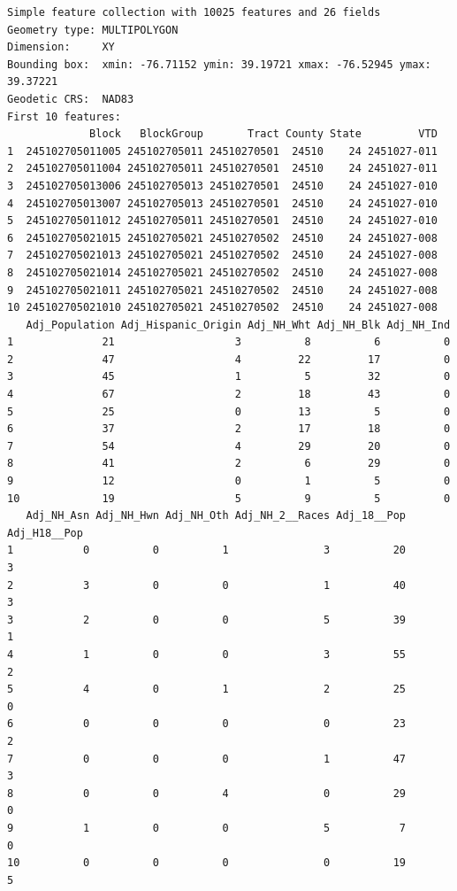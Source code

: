 \documentclass[
  letterpaper,
  DIV=11,
  numbers=noendperiod]{scrreprt}
\begin{document}
\begin{verbatim}
Simple feature collection with 10025 features and 26 fields
Geometry type: MULTIPOLYGON
Dimension:     XY
Bounding box:  xmin: -76.71152 ymin: 39.19721 xmax: -76.52945 ymax: 39.37221
Geodetic CRS:  NAD83
First 10 features:
             Block   BlockGroup       Tract County State         VTD
1  245102705011005 245102705011 24510270501  24510    24 2451027-011
2  245102705011004 245102705011 24510270501  24510    24 2451027-011
3  245102705013006 245102705013 24510270501  24510    24 2451027-010
4  245102705013007 245102705013 24510270501  24510    24 2451027-010
5  245102705011012 245102705011 24510270501  24510    24 2451027-010
6  245102705021015 245102705021 24510270502  24510    24 2451027-008
7  245102705021013 245102705021 24510270502  24510    24 2451027-008
8  245102705021014 245102705021 24510270502  24510    24 2451027-008
9  245102705021011 245102705021 24510270502  24510    24 2451027-008
10 245102705021010 245102705021 24510270502  24510    24 2451027-008
   Adj_Population Adj_Hispanic_Origin Adj_NH_Wht Adj_NH_Blk Adj_NH_Ind
1              21                   3          8          6          0
2              47                   4         22         17          0
3              45                   1          5         32          0
4              67                   2         18         43          0
5              25                   0         13          5          0
6              37                   2         17         18          0
7              54                   4         29         20          0
8              41                   2          6         29          0
9              12                   0          1          5          0
10             19                   5          9          5          0
   Adj_NH_Asn Adj_NH_Hwn Adj_NH_Oth Adj_NH_2__Races Adj_18__Pop Adj_H18__Pop
1           0          0          1               3          20            3
2           3          0          0               1          40            3
3           2          0          0               5          39            1
4           1          0          0               3          55            2
5           4          0          1               2          25            0
6           0          0          0               0          23            2
7           0          0          0               1          47            3
8           0          0          4               0          29            0
9           1          0          0               5           7            0
10          0          0          0               0          19            5

\end{verbatim}
\end{document}
